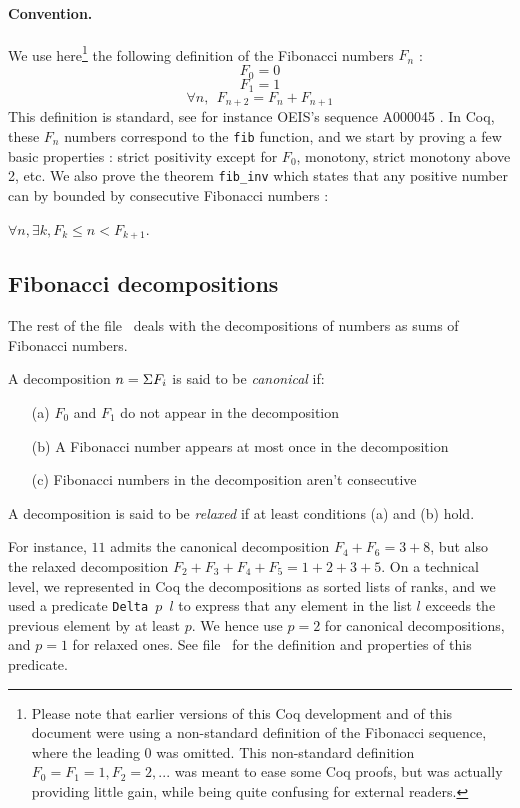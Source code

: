 \documentclass[a4paper,11pt]{article}
\begin{document}
\paragraph{Convention.} We use here\footnote{
Please note that earlier versions of this Coq development
and of this document were using a non-standard definition
of the Fibonacci sequence, where the leading 0 was omitted.
This non-standard definition $F_0=F_1=1, F_2=2, ...$ was meant
to ease some Coq proofs, but was actually providing little gain,
while being quite confusing for external readers.}
the following definition of the Fibonacci numbers $F_n$ :
$$F_0 = 0 $$
$$F_1 = 1 $$
$$\forall n,~~ F_{n+2} = F_{n}+F_{n+1}$$
This definition is standard, see for instance OEIS's sequence A000045
\cite{OEIS-Fib}.
In Coq, these $F_n$ numbers correspond to the {\tt fib}
function, and we start by proving a few basic properties :
strict positivity except for $F_0$, monotony, strict monotony
above 2, etc. 
We also prove the theorem {\tt fib\_inv} which states 
that any positive number can by bounded by
consecutive Fibonacci numbers :

\begin{theorem}\label{fibinv}
$\forall n, \exists k, F_k \le n < F_{k+1}$.
\end{theorem}

\subsection{Fibonacci decompositions} The rest of the file \
deals with the decompositions of numbers as sums of Fibonacci
numbers.
\begin{definition}
 A decomposition $n = \Sigma F_i$ is said to be \emph{canonical} if:
\begin{itemize}
\item[(a)] $F_0$ and $F_1$ do not appear in the decomposition
\item[(b)] A Fibonacci number appears at most once in the decomposition
\item[(c)] Fibonacci numbers in the decomposition aren't consecutive
\end{itemize}
A decomposition is said to be \emph{relaxed} if at least conditions
(a) and (b) hold. 
\end{definition}
For instance, $11$ admits the canonical decomposition
$F_4+F_6 = 3 + 8$, but also the relaxed decomposition $F_2+F_3+F_4+F_5
= 1 + 2 + 3 + 5$.
On a technical level, we represented in Coq the decompositions
as sorted lists of ranks, and we used a predicate {\tt Delta $p$ $l$}
to express that any element in the list $l$ exceeds the previous
element by at least $p$. We hence use $p=2$ for canonical
decompositions, and $p=1$ for relaxed ones. See file
\ for the definition and properties of this
predicate.
\end{document}
